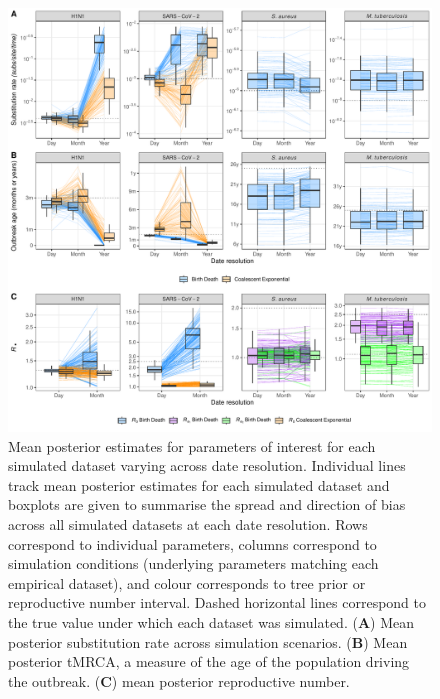 \documentclass[12pt]{article}
\begin{document}
\begin{spacing}{2}
\begin{figure}[H]
    \centering
    \includegraphics[width=\textwidth]{simulation_parm_panel.pdf}
    \caption{Mean posterior estimates for parameters of interest for each simulated dataset varying across date resolution. Individual lines track mean posterior estimates for each simulated dataset and boxplots are given to summarise the spread and direction of bias across all simulated datasets at each date resolution. Rows correspond to individual parameters, columns correspond to simulation conditions (underlying parameters matching each empirical dataset), and colour corresponds to tree prior or reproductive number interval. Dashed horizontal lines correspond to the true value under which each dataset was simulated. (\textbf{A}) Mean posterior substitution rate across simulation scenarios. (\textbf{B}) Mean posterior tMRCA, a measure of the age of the population driving the outbreak. (\textbf{C}) mean posterior reproductive number.}
    \label{fig:sim-parms}
\end{figure}


\end{spacing}
\end{document}
